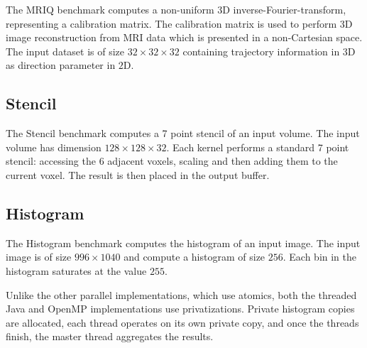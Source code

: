 The MRIQ benchmark computes a non-uniform 3D inverse-Fourier-transform, representing a calibration matrix.
The calibration matrix is used to perform 3D image reconstruction from MRI data which is 
	presented in a non-Cartesian space.
The input dataset is of size $32 \times 32 \times 32$ containing trajectory information in $3$D
	as direction parameter in $2$D.

\subsection{Stencil}

The Stencil benchmark computes a 7 point stencil of an input volume. 
The input volume has dimension $128 \times 128 \times 32$.
Each kernel performs a standard 7 point stencil: accessing the $6$ adjacent voxels,
	scaling and then adding them to the current voxel.
The result is then placed in the output buffer.

\subsection{Histogram}

The Histogram benchmark computes the histogram of an input image.
The input image is of size $996 \times 1040$ and compute a 
	histogram of size $256$.
Each bin in the histogram saturates at the value $255$.

Unlike the other parallel implementations, which use atomics, both the
	threaded Java and OpenMP implementations use privatizations.
Private histogram copies are allocated, each thread 
	operates on its own private copy, and once the threads finish, the
	master thread aggregates the results.

